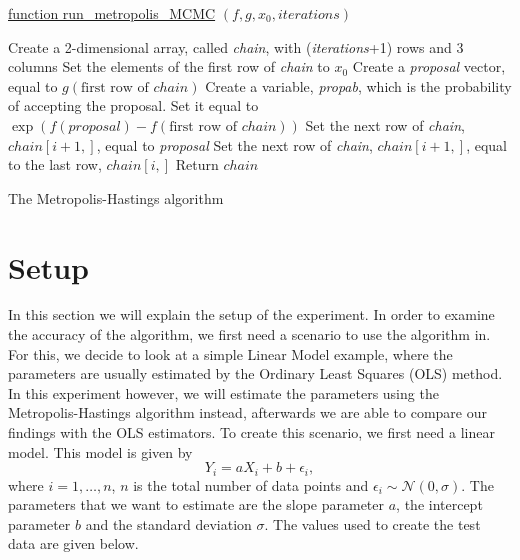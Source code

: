 \documentclass[a4paper,10pt]{article}\usepackage[]{graphicx}\usepackage[]{color}
\begin{document}
\begin{algorithm}[H]

    \underline{function run\_metropolis\_MCMC} $(f, g, x_0, iterations)$\;
    
    Create a 2-dimensional array, called \emph{chain}, with (\emph{iterations}+1) rows and 3 columns\;
    Set the elements of the first row of \emph{chain} to $x_0$\;
      {
        Create a \emph{proposal} vector, equal to $g(\text{first row of } chain)$\;
        Create a variable, \emph{propab}, which is the probability of accepting the proposal. Set it equal to $\exp{(f(proposal) - f(\text{first row of } chain))}$\;
        {
          Set the next row of \emph{chain}, $chain[i+1,]$, equal to \emph{proposal}\;
        }
      \uElse
        {
          Set the next row of \emph{chain}, $chain[i+1,]$, equal to the last row, $chain[i,]$\;
        }
      }
    Return $chain$\;
    \caption{The Metropolis-Hastings algorithm}
\end{algorithm}



\newpage
\section{Setup}\label{Set}
In this section we will explain the setup of the experiment. In order to examine the accuracy of the algorithm, we first need a scenario to use the algorithm in. For this, we decide to look at a simple Linear Model example, where the parameters are usually estimated by the Ordinary Least Squares (OLS) method. In this experiment however, we will estimate the parameters using the Metropolis-Hastings algorithm instead, afterwards we are able to compare our findings with the OLS estimators. To create this scenario, we first need a linear model. This model is given by
$$ Y_i = a X_i + b + \epsilon_i, $$
where $i = 1,\dots, n$, $n$ is the total number of data points and $\epsilon_i \sim \mathcal{N}(0,\sigma)$. The parameters that we want to estimate are the slope parameter $a$, the intercept parameter $b$ and the standard deviation $\sigma$. The values used to create the test data are given below.
\end{document}
